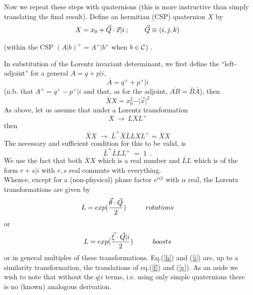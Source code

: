 Now we repeat these steps with quaternions (this is more instructive than
simply translating the final result).
Define an hermitian (CSP) quaternion $X$ by
\begin{equation}
X = x_{0} + \vec{Q} \cdot \vec{x}\vert i \: ;
\hspace*{8mm} \vec{Q} \equiv (i, j, k)
\end{equation}
\begin{center}
(within the CSP $(A\vert b)^{+} = A^{+} \vert b^{+}$ when $b\in {\cal C}$) .
\end{center}
In substitution of the Lorentz invariant determinant, we first define the
``left-adjoint'' for a general $A = q + p\vert i$,
\begin{equation}
\bar{A} = q^{+} + p^{+} \vert i
\end{equation}
(n.b. that $A^{+} = q^{+} - p^{+} \vert i$ and that, as for the
adjoint, $\overline{AB} = \bar{B}\bar{A}$), then
\begin{equation}
\bar{X}X = x_{0}^{2} - \vert \vec{x}\vert^{2}
\end{equation}
As above, let us assume that under a Lorentz transformation
\[ X \: \rightarrow \: LXL^{+} \]
then
\begin{equation}
\bar{X}X \; \rightarrow \; \bar{L}^{+}\bar{X}\bar{L}LXL^{+}=\bar{X}X
\end{equation}
The necessary and sufficient condition for this to be valid, is
\begin{equation}
\bar{L}^{+}\bar{L}LL^{+} \; = \; 1 \; \: .
\end{equation}
We use the fact that both $\bar{X}X$ which is a real number and
$\bar{L}L$ which is of the form $r + s\vert i$ with $r, s$ real commute
with everything.\\
Whence, except for a (non-physical) phase factor $e^{\alpha\vert i}$ with
$\alpha$ real, the Lorentz transformations are given by
\begin{equation} \label{h}
L = exp(\frac{\vec{\theta} \cdot \vec{Q}}{2}) \hspace*{10mm} rotations
\end{equation}
or
\begin{equation} \label{i}
L = exp(\frac{\vec{\xi} \cdot \vec{Q}\vert i}{2}) \hspace{10mm} boosts
\end{equation}
or in general multiples of these transformations. Eq.(\ref{h})
and (\ref{i}) are, up to a similarity transformation, the
translations of eq.(\ref{f}) and (\ref{g}). As an aside we wish to note
that without the $q\vert i$ terms, i.e. using only simple quaternions there
is no (known) analogous derivation.

